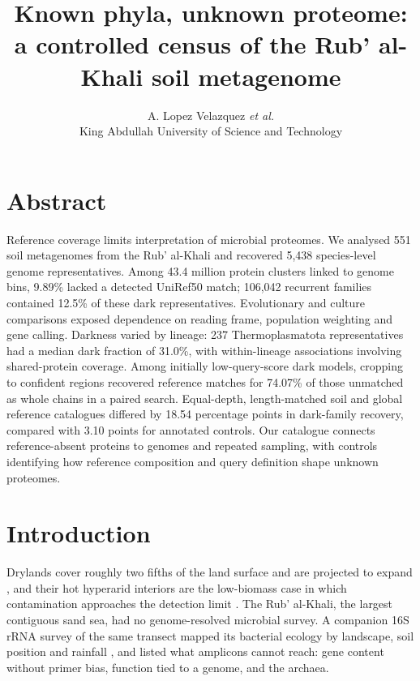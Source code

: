 \documentclass[11pt]{article}
\title{\textbf{Known phyla, unknown proteome:\\ a controlled census of the Rub' al-Khali soil metagenome}}
\author{A. Lopez Velazquez \textit{et al.}\\ \small King Abdullah University of Science and Technology}
\date{}
\begin{document}
\maketitle

\section*{Abstract}
Reference coverage limits interpretation of microbial proteomes. We analysed 551 soil
metagenomes from the Rub' al-Khali and recovered 5{,}438 species-level genome representatives.
Among 43.4 million protein clusters linked to genome bins, 9.89\% lacked a detected UniRef50
match; 106{,}042 recurrent families contained 12.5\% of these dark representatives.
Evolutionary and culture comparisons exposed dependence on reading frame, population weighting
and gene calling. Darkness varied by lineage: 237 Thermoplasmatota representatives had a median
dark fraction of 31.0\%, with within-lineage associations involving shared-protein coverage.
Among initially low-query-score dark models, cropping to confident regions recovered reference
matches for 74.07\% of those unmatched as whole chains in a paired search. Equal-depth, length-matched soil and global
reference catalogues differed by 18.54 percentage points in dark-family recovery, compared
with 3.10 points for annotated controls. Our catalogue connects reference-absent proteins to genomes and repeated sampling, with controls
identifying how reference composition and query definition shape unknown proteomes.

\section*{Introduction}

Drylands cover roughly two fifths of the land surface and are projected to expand
\citep{huang2016dryland,maestre2015aridity}, and their hot hyperarid interiors are the low-biomass
case in which contamination approaches the detection limit \citep{contamination2025guidelines}. The
Rub' al-Khali, the largest contiguous sand sea, had no genome-resolved microbial survey. A companion
16S rRNA survey of the same transect mapped its bacterial ecology by landscape, soil position and
rainfall \citep{tawfiq2026companion}, and listed what
amplicons cannot reach: gene content without primer bias, function tied to a genome, and the archaea.
\end{document}
